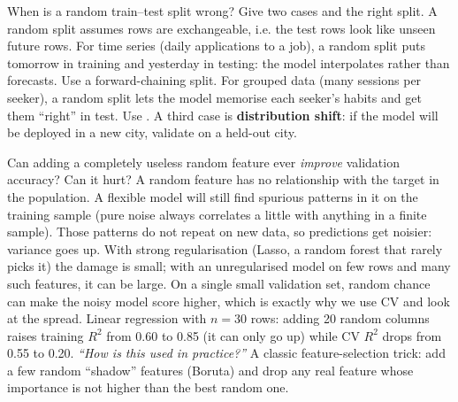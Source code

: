 \begin{qa}{When is a random train--test split wrong? Give two cases and the right split.}
\why
A random split assumes rows are exchangeable, i.e. the test rows look like unseen future rows. For time series
(daily applications to a job), a random split puts tomorrow in training and yesterday in testing: the model
interpolates rather than forecasts. Use a forward-chaining split. For grouped data (many sessions per seeker),
a random split lets the model memorise each seeker's habits and get them ``right'' in test. Use
. A third case is \textbf{distribution shift}: if the model will be deployed in a new city,
validate on a held-out city.
\end{qa}

\begin{qa}{\deep Can adding a completely useless random feature ever \emph{improve} validation accuracy? Can it
hurt?}
\why
A random feature has no relationship with the target in the population. A flexible model will still find
spurious patterns in it on the training sample (pure noise always correlates a little with anything in a
finite sample). Those patterns do not repeat on new data, so predictions get noisier: variance goes up. With
strong regularisation (Lasso, a random forest that rarely picks it) the damage is small; with an unregularised
model on few rows and many such features, it can be large. On a single small validation set, random chance can
make the noisy model score higher, which is exactly why we use CV and look at the spread.
\worked Linear regression with $n = 30$ rows: adding 20 random columns raises training $R^2$ from 0.60 to 0.85
(it can only go up) while CV $R^2$ drops from 0.55 to 0.20.
\pushes \emph{``How is this used in practice?''} A classic feature-selection trick: add a few random ``shadow''
features (Boruta) and drop any real feature whose importance is not higher than the best random one.
\end{qa}

